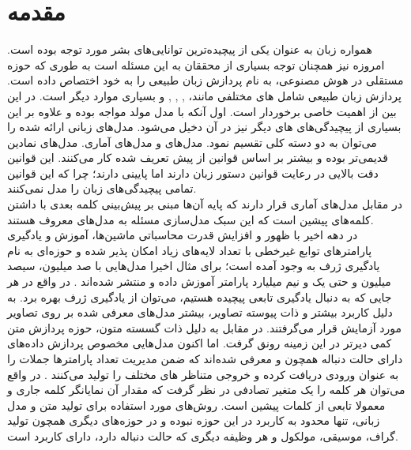 \chapter{مقدمه}\label{Chap:Chap1}
\minitoc
همواره زبان به عنوان یکی از پیچیده‌ترین توانایی‌های بشر مورد توجه بوده است. امروزه نیز همچنان توجه بسیاری از محققان به این مسئله است به طوری که حوزه مستقلی در هوش مصنوعی، به نام پردازش زبان طبیعی را به خود اختصاص داده است. پردازش زبان طبیعی شامل
های
مختلفی مانند،
,
,
,
و بسیاری موارد دیگر است. در این بین \task{}
از اهمیت خاصی برخوردار است. اول آنکه با مدل مولد مواجه بوده و علاوه بر این بسیاری از پیچیدگی‌های \task{}‌های دیگر نیز در آن دخیل می‌شود.
مدل‌های زبانی ارائه شده را می‌توان به دو دسته کلی تقسیم نمود. مدل‌های 
و مدل‌های آماری. مدل‌های نمادین قدیمی‌تر بوده و بیشتر بر اساس قوانین از پیش تعریف شده کار می‌کنند. این قوانین دقت بالایی در رعایت قوانین دستور زبان دارند اما
پایینی دارند؛ چرا که این قوانین تمامی پیچیدگی‌های زبان را مدل نمی‌کنند.\\
در مقابل مدل‌های آماری قرار دارند که پایه آن‌ها مبنی بر پیش‌بینی کلمه بعدی با داشتن کلمه‌های پیشین است که این سبک مدل‌سازی مسئله به مدل‌های 
معروف هستند. \\
در دهه اخیر با ظهور
و افزایش قدرت محاسباتی ماشین‌ها، آموزش و یادگیری پارامترهای توابع غیرخطی با تعداد لایه‌های زیاد امکان پذیر شده و حوزه‌ای به نام یادگیری ژرف به وجود آمده است؛ برای مثال اخیرا مدل‌هایی با صد میلیون، سیصد میلیون و حتی یک و نیم میلیارد پارامتر آموزش داده و منتشر شده‌اند \cite{bert}. در واقع در هر جایی که به دنبال یادگیری تابعی پیچیده هستیم، می‌توان از یادگیری ژرف بهره برد. به دلیل کاربرد بیشتر و ذات پیوسته تصاویر، بیشتر مدل‌های معرفی شده بر روی تصاویر مورد آزمایش قرار می‌گرفتند. در مقابل به دلیل ذات گسسته متون، حوزه پردازش متن کمی دیرتر در این زمینه رونق گرفت. اما اکنون مدل‌هایی مخصوص پردازش داده‌های دارای حالت دنباله همچون \lstm{} و \transformer{} معرفی شده‌اند که ضمن مدیریت تعداد پارامتر‌ها جملات را به عنوان ورودی دریافت کرده و خروجی متناظر \task{}های مختلف را تولید می‌کنند \cite{transformer, lstm}. در واقع می‌توان هر کلمه را یک متغیر تصادفی در نظر گرفت که مقدار آن نمایانگر کلمه جاری و معمولا تابعی از کلمات پیشین است. روش‌های مورد استفاده برای تولید متن و مدل زبانی، تنها محدود به کاربرد در این حوزه نبوده و در حوزه‌های دیگری همچون تولید گراف، موسیقی، مولکول و هر وظیفه دیگری که حالت دنباله دارد، دارای کاربرد است.\\

